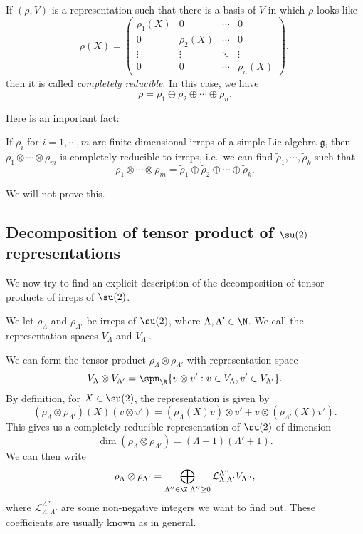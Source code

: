 \documentclass[a4paper]{article}
\begin{document}
\begin{defi}
  If $(\rho, V)$ is a representation such that there is a basis of $V$ in which $\rho$ looks like
  \[
    \rho(X) =
    \begin{pmatrix}
      \rho_1(X) & 0 & \cdots & 0\\
      0 & \rho_2(X) & \cdots & 0\\
      \vdots & \vdots & \ddots & \vdots\\
      0 & 0 & \cdots & \rho_n(X)
    \end{pmatrix},
  \]
  then it is called \emph{completely reducible}. In this case, we have
  \[
    \rho = \rho_1 \oplus \rho_2 \oplus \cdots \oplus \rho_n.
  \]
\end{defi}

Here is an important fact:
\begin{thm}
  If $\rho_i$ for $i = 1,\cdots, m$ are finite-dimensional irreps of a simple Lie algebra $\mathfrak{g}$, then $\rho_1 \otimes \cdots \otimes \rho_m$ is completely reducible to irreps, i.e.\ we can find $\tilde{\rho}_1, \cdots, \tilde{\rho}_k$ such that
  \[
    \rho_1 \otimes \cdots \otimes \rho_m = \tilde{\rho}_1 \oplus \tilde{\rho}_2 \oplus \cdots \oplus \tilde{\rho}_k.
  \]
\end{thm}
We will not prove this.
\subsection{Decomposition of tensor product of \texorpdfstring{$\su(2)$}{su(2)} representations}
We now try to find an explicit description of the decomposition of tensor products of irreps of $\su(2)$.

We let $\rho_\Lambda$ and $\rho_{\Lambda'}$ be irreps of $\su(2)$, where $\Lambda, \Lambda' \in \N$. We call the representation spaces $V_\Lambda$ and $V_{\Lambda'}$.

We can form the tensor product $\rho_\Lambda \otimes \rho_{\Lambda'}$ with representation space
\[
  V_\Lambda \otimes V_{\Lambda'} = \spn_\R \{v \otimes v': v \in V_\Lambda, v' \in V_{\Lambda'}\}.
\]
By definition, for $X \in \su(2)$, the representation is given by
\[
  (\rho_\Lambda \otimes \rho_{\Lambda'})(X)(v \otimes v') = (\rho_\Lambda(X)v) \otimes v' + v \otimes (\rho_{\Lambda'}(X)v').
\]
This gives us a completely reducible representation of $\su(2)$ of dimension
\[
  \dim (\rho_\Lambda \otimes \rho_{\Lambda'}) = (\Lambda + 1)(\Lambda' + 1).
\]
We can then write
\[
  \rho_\Lambda \otimes \rho_{\Lambda'} = \bigoplus_{\Lambda'' \in \Z, \Lambda'' \geq 0} \mathcal{L}^{\Lambda''}_{\Lambda, \Lambda'} V_{\Lambda''},
\]
where $\mathcal{L}^{\Lambda''}_{\Lambda, \Lambda'}$ are some non-negative integers we want to find out. These coefficients are usually known as  in general.
\end{document}
